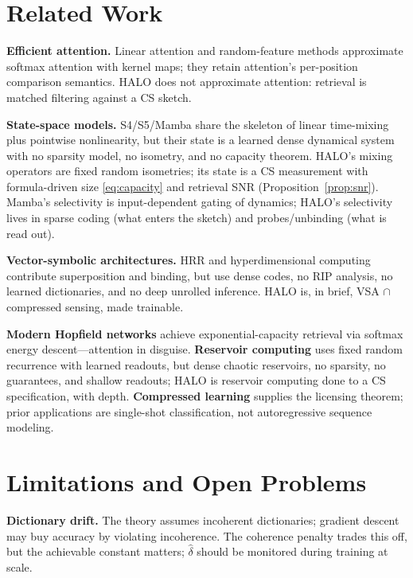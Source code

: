 \documentclass[11pt]{article}
\begin{document}
\section{Related Work}

\textbf{Efficient attention.} Linear attention \citep{katharopoulos2020transformers} and random-feature methods \citep{choromanski2021performers} approximate softmax attention with kernel maps; they retain attention's per-position comparison semantics. HALO does not approximate attention: retrieval is matched filtering against a CS sketch.

\textbf{State-space models.} S4/S5/Mamba \citep{gu2022s4,smith2023s5,gu2023mamba} share the skeleton of linear time-mixing plus pointwise nonlinearity, but their state is a learned dense dynamical system with no sparsity model, no isometry, and no capacity theorem. HALO's mixing operators are fixed random isometries; its state is a CS measurement with formula-driven size \eqref{eq:capacity} and retrieval SNR (Proposition~\ref{prop:snr}). Mamba's selectivity is input-dependent gating of dynamics; HALO's selectivity lives in sparse coding (what enters the sketch) and probes/unbinding (what is read out).

\textbf{Vector-symbolic architectures.} HRR and hyperdimensional computing \citep{plate1995holographic,kanerva2009hyperdimensional} contribute superposition and binding, but use dense codes, no RIP analysis, no learned dictionaries, and no deep unrolled inference. HALO is, in brief, VSA $\cap$ compressed sensing, made trainable.

\textbf{Modern Hopfield networks} \citep{ramsauer2021hopfield} achieve exponential-capacity retrieval via softmax energy descent---attention in disguise. \textbf{Reservoir computing} \citep{jaeger2004harnessing} uses fixed random recurrence with learned readouts, but dense chaotic reservoirs, no sparsity, no guarantees, and shallow readouts; HALO is reservoir computing done to a CS specification, with depth. \textbf{Compressed learning} \citep{calderbank2009compressed} supplies the licensing theorem; prior applications are single-shot classification, not autoregressive sequence modeling.

\section{Limitations and Open Problems}

\textbf{Dictionary drift.} The theory assumes incoherent dictionaries; gradient descent may buy accuracy by violating incoherence. The coherence penalty trades this off, but the achievable constant matters; $\hat\delta$ should be monitored during training at scale.
\end{document}
